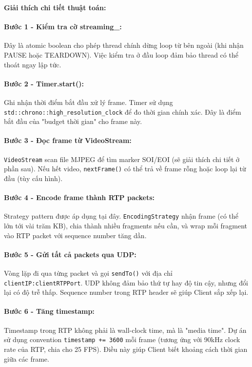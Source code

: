 \textbf{Giải thích chi tiết thuật toán:}

\paragraph{Bước 1 - Kiểm tra cờ streaming\_:} Đây là atomic boolean cho phép thread chính dừng loop từ bên ngoài (khi nhận PAUSE hoặc TEARDOWN). Việc kiểm tra ở đầu loop đảm bảo thread có thể thoát ngay lập tức.

\paragraph{Bước 2 - Timer.start():} Ghi nhận thời điểm bắt đầu xử lý frame. Timer sử dụng \texttt{std::chrono::high\_resolution\_clock} để đo thời gian chính xác. Đây là điểm bắt đầu của "budget thời gian" cho frame này.

\paragraph{Bước 3 - Đọc frame từ VideoStream:} \texttt{VideoStream} scan file MJPEG để tìm marker SOI/EOI (sẽ giải thích chi tiết ở phần sau). Nếu hết video, \texttt{nextFrame()} có thể trả về frame rỗng hoặc loop lại từ đầu (tùy cấu hình).

\paragraph{Bước 4 - Encode frame thành RTP packets:} Strategy pattern được áp dụng tại đây. \texttt{EncodingStrategy} nhận frame (có thể lớn tới vài trăm KB), chia thành nhiều fragments nếu cần, và wrap mỗi fragment vào RTP packet với sequence number tăng dần.

\paragraph{Bước 5 - Gửi tất cả packets qua UDP:} Vòng lặp đi qua từng packet và gọi \texttt{sendTo()} với địa chỉ \texttt{clientIP:clientRTPPort}. UDP không đảm bảo thứ tự hay độ tin cậy, nhưng đổi lại có độ trễ thấp. Sequence number trong RTP header sẽ giúp Client sắp xếp lại.

\paragraph{Bước 6 - Tăng timestamp:} Timestamp trong RTP không phải là wall-clock time, mà là "media time". Dự án sử dụng convention \texttt{timestamp += 3600} mỗi frame (tương ứng với 90kHz clock rate của RTP, chia cho 25 FPS). Điều này giúp Client biết khoảng cách thời gian giữa các frame.

